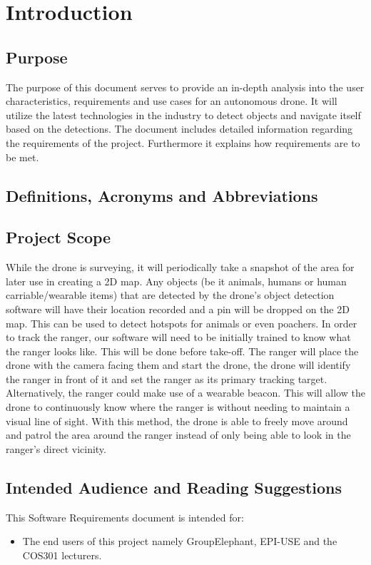 \chapter{Introduction}

\section{Purpose}
The purpose of this document serves to provide an in-depth analysis into the user characteristics, requirements and use cases for an autonomous drone. 
It will utilize the latest technologies in the industry to detect objects and navigate itself based on the detections. 
The document includes detailed information regarding the requirements of the project.
Furthermore it explains how requirements are to be met.

\section{Definitions, Acronyms and Abbreviations}

\section{Project Scope}
While the drone is surveying, it will periodically take a snapshot of the area for later use in creating a 2D map. Any objects (be it animals, humans or human carriable/wearable items) that are detected by the drone’s object detection software will have their location recorded and a pin will be dropped on the 2D map. This can be used to detect hotspots for animals or even poachers.
\newline
In order to track the ranger, our software will need to be initially trained to know what the ranger looks like. This will be done before take-off. The ranger will place the drone with the camera facing them and start the drone, the drone will identify the ranger in front of it and set the ranger as its primary tracking target.
\newline
Alternatively, the ranger could make use of a wearable beacon. This will allow the drone to continuously know where the ranger is without needing to maintain a visual line of sight. With this method, the drone is able to freely move around and patrol the area around the ranger instead of only being able to look in the ranger’s direct vicinity.
\newline

\section{Intended Audience and Reading Suggestions}
This Software Requirements document is intended for:

\begin{itemize}
	\item The end users of this project namely GroupElephant, EPI-USE and the COS301 lecturers.
\end{itemize}



